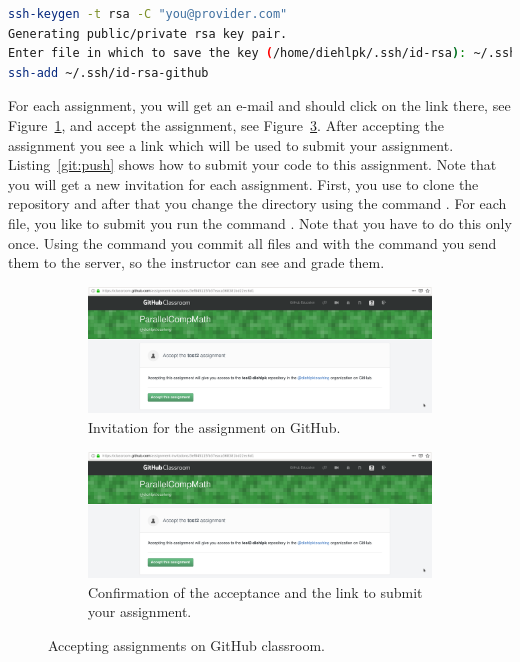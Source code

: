 \documentclass[11pt,fleqn]{book} %
\begin{document}
\begin{lstlisting}[language=bash,caption={Setting up a ssh key\label{git:ssh:key}},float,floatplacement=tb]
ssh-keygen -t rsa -C "you@provider.com"
Generating public/private rsa key pair.
Enter file in which to save the key (/home/diehlpk/.ssh/id-rsa): ~/.ssh/id-rsa-github
ssh-add ~/.ssh/id-rsa-github
\end{lstlisting}


For each assignment, you will get an e-mail and should click on the link there, see Figure~\ref{fig::github:invitation}, and accept the assignment, see Figure~\ref{fig::github:assignment}. After accepting the assignment you see a link which will be used to submit your assignment. Listing~\ref{git:push} shows how to submit your code to this assignment. Note that you will get a new invitation for each assignment. First, you use  to clone the repository and after that you change the directory using the command . For each file, you like to submit you run the command . Note that you have to do this only once. Using the command  you commit all files and with the command  you send them to the server, so the instructor can see and grade them.


\begin{figure}[bt]
\centering
\begin{subfigure}{.75\textwidth}
  \centering
\includegraphics[width=\textwidth]{images/2019-05-17-github-assingment}
\caption{Invitation for the assignment on GitHub.}
\label{fig::github:invitation}
\end{subfigure}

\begin{subfigure}{.75\textwidth}
  \centering
\includegraphics[width=\textwidth]{images/2019-05-17-github-assingment}
\caption{Confirmation of the acceptance and the link to submit your assignment.}
\label{fig::github:assignment}
\end{subfigure}
\caption{Accepting assignments on GitHub classroom.}
\end{figure}
\end{document}
